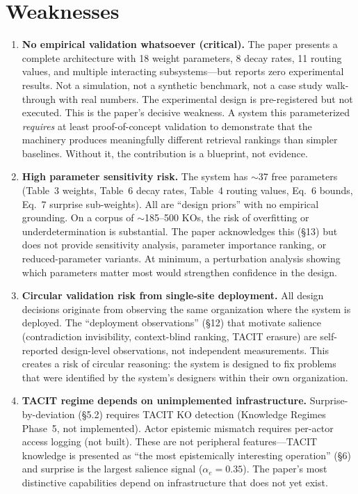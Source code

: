 \documentclass[11pt,a4paper]{article}
\begin{document}
\section{Weaknesses}

\begin{enumerate}[label=\textbf{W\arabic*.}, leftmargin=2em]

\item \textbf{No empirical validation whatsoever (critical).} The paper presents a complete architecture with 18 weight parameters, 8 decay rates, 11 routing values, and multiple interacting subsystems---but reports zero experimental results. Not a simulation, not a synthetic benchmark, not a case study walk-through with real numbers. The experimental design is pre-registered but not executed. This is the paper's decisive weakness. A system this parameterized \emph{requires} at least proof-of-concept validation to demonstrate that the machinery produces meaningfully different retrieval rankings than simpler baselines. Without it, the contribution is a blueprint, not evidence.

\item \textbf{High parameter sensitivity risk.} The system has $\sim$37 free parameters (Table~3 weights, Table~6 decay rates, Table~4 routing values, Eq.~6 bounds, Eq.~7 surprise sub-weights). All are ``design priors'' with no empirical grounding. On a corpus of $\sim$185--500 KOs, the risk of overfitting or underdetermination is substantial. The paper acknowledges this (\S13) but does not provide sensitivity analysis, parameter importance ranking, or reduced-parameter variants. At minimum, a perturbation analysis showing which parameters matter most would strengthen confidence in the design.

\item \textbf{Circular validation risk from single-site deployment.} All design decisions originate from observing the same organization where the system is deployed. The ``deployment observations'' (\S12) that motivate salience (contradiction invisibility, context-blind ranking, TACIT erasure) are self-reported design-level observations, not independent measurements. This creates a risk of circular reasoning: the system is designed to fix problems that were identified by the system's designers within their own organization.

\item \textbf{TACIT regime depends on unimplemented infrastructure.} Surprise-by-deviation (\S5.2) requires TACIT KO detection (Knowledge Regimes Phase~5, not implemented). Actor epistemic mismatch requires per-actor access logging (not built). These are not peripheral features---TACIT knowledge is presented as ``the most epistemically interesting operation'' (\S6) and surprise is the largest salience signal ($\alpha_e = 0.35$). The paper's most distinctive capabilities depend on infrastructure that does not yet exist.


\end{enumerate}
\end{document}
